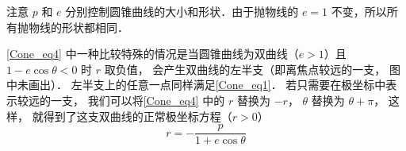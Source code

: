 注意 $p$ 和 $e$ 分别控制圆锥曲线的大小和形状．由于抛物线的 $e = 1$ 不变，所以所有抛物线的形状都相同．

\autoref{Cone_eq4} 中一种比较特殊的情况是当圆锥曲线为双曲线（$e > 1$）且 $1- e\cos\theta < 0$ 时 $r$ 取负值， 会产生双曲线的左半支（即离焦点较远的一支， 图中未画出）． 左半支上的任意一点同样满足\autoref{Cone_eq1}． 若只需要在极坐标中表示较远的一支， 我们可以将\autoref{Cone_eq4} 中的 $r$ 替换为 $-r$， $\theta$ 替换为 $\theta + \pi$， 这样， 就得到了这支双曲线的正常极坐标方程（$r > 0$）
\begin{equation}\label{Cone_eq6}
r = -\frac{p}{1 + e\cos\theta}
\end{equation}
